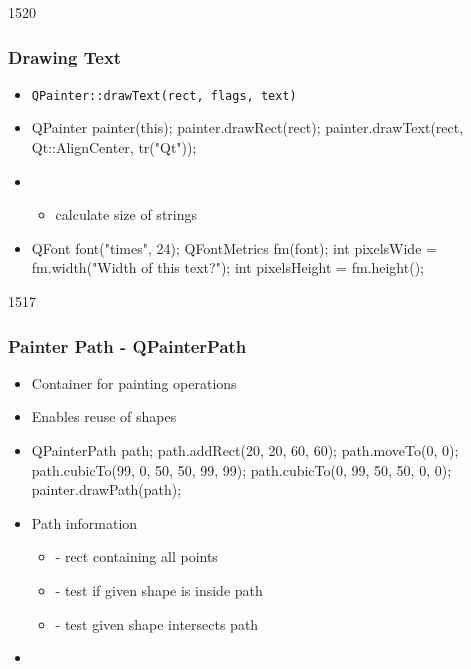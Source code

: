 \begin{slide}[fragile]{1520}\frametitle{Drawing Text}
  \begin{itemize}
  \item \texttt{QPainter::drawText(rect, flags, text)}
  \item[] \begin{cpp}
QPainter painter(this);
painter.drawRect(rect);      
painter.drawText(rect, Qt::AlignCenter, tr("Qt"));
    \end{cpp}
 \item {}
      \begin{itemize}
      \item calculate size of strings
      \end{itemize}
    \item[] \begin{cpp}
QFont font("times", 24);
QFontMetrics fm(font);
int pixelsWide = fm.width("Width of this text?");
int pixelsHeight = fm.height();        
      \end{cpp}
  \end{itemize}
\end{slide}

\begin{slide}[fragile]{1517}\frametitle{Painter Path - QPainterPath}
  \begin{itemize}
  \item Container for painting operations
  \item Enables reuse of shapes
  \item[] \begin{cpp}
QPainterPath path;
path.addRect(20, 20, 60, 60);
path.moveTo(0, 0);
path.cubicTo(99, 0,  50, 50,  99, 99);
path.cubicTo(0, 99,  50, 50,  0, 0);      
painter.drawPath(path);
    \end{cpp}
  \item Path information
    \begin{itemize}
    \item {} - rect containing all points
    \item {} - test if given shape is inside path
    \item {} - test given shape intersects path
    \end{itemize}

  \item[] 

  \end{itemize}

\end{slide}


